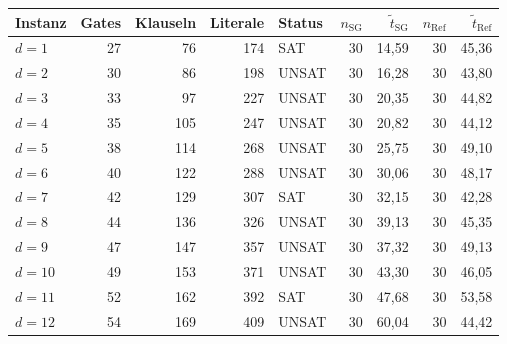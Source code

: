 \begin{tabular}{lrrrlrrrr}
\toprule
Instanz & Gates & Klauseln & Literale & Status & $n_{\mathrm{SG}}$ & $\tilde{t}_{\mathrm{SG}}$ & $n_{\mathrm{Ref}}$ & $\tilde{t}_{\mathrm{Ref}}$ \\
\midrule
$d=1$ & 27 & 76 & 174 & SAT & 30 & 14{,}59 & 30 & 45{,}36 \\
$d=2$ & 30 & 86 & 198 & UNSAT & 30 & 16{,}28 & 30 & 43{,}80 \\
$d=3$ & 33 & 97 & 227 & UNSAT & 30 & 20{,}35 & 30 & 44{,}82 \\
$d=4$ & 35 & 105 & 247 & UNSAT & 30 & 20{,}82 & 30 & 44{,}12 \\
$d=5$ & 38 & 114 & 268 & UNSAT & 30 & 25{,}75 & 30 & 49{,}10 \\
$d=6$ & 40 & 122 & 288 & UNSAT & 30 & 30{,}06 & 30 & 48{,}17 \\
$d=7$ & 42 & 129 & 307 & SAT & 30 & 32{,}15 & 30 & 42{,}28 \\
$d=8$ & 44 & 136 & 326 & UNSAT & 30 & 39{,}13 & 30 & 45{,}35 \\
$d=9$ & 47 & 147 & 357 & UNSAT & 30 & 37{,}32 & 30 & 49{,}13 \\
$d=10$ & 49 & 153 & 371 & UNSAT & 30 & 43{,}30 & 30 & 46{,}05 \\
$d=11$ & 52 & 162 & 392 & SAT & 30 & 47{,}68 & 30 & 53{,}58 \\
$d=12$ & 54 & 169 & 409 & UNSAT & 30 & 60{,}04 & 30 & 44{,}42 \\
\bottomrule
\end{tabular}
